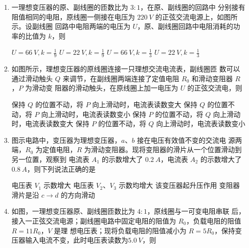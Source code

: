\begin{enumerate}
\item 
{}
一理想变压器的原、副线圈的匝数比为 $ 3:1 $，在原、副线圈的回路中
分别接有阻值相同的电阻，原线圈一侧接在电压为 $ 220 \ V $ 的正弦交流电源上，如图所示。设副线圈
回路中电阻两端的电压为 $ U $，原、副线圈回路中电阻消耗的功率的比值为 $ k $，则  
\begin{figure}[h!]
\centering

\end{figure}

\fourchoices
{$ U=66 \ V ,k= \frac{ 1 }{ 9 } $}
{$ U=22 \ V ,k= \frac{ 1 }{ 9 } $}
{$ U=66 \ V ,k= \frac{ 1 }{ 3 } $}
{$ U=22 \ V ,k= \frac{ 1 }{ 3 } $}


\item 
{}
如图所示，理想变压器的原线圈连接一只理想交流电流表，副线圈匝
数可以通过滑动触头 $ Q $ 来调节，在副线圈两端连接了定值电阻 $ R_{0} $ 和滑动变阻器 $ R $，$ P $ 为滑动变
阻器的滑动触头，在原线圈上加一电压为 $ U $ 的正弦交流电，则  
\begin{figure}[h!]
\centering

\end{figure}

\fourchoices
{保持 $ Q $ 的位置不动，将 $ P $ 向上滑动时，电流表读数变大}
{保持 $ Q $ 的位置不动，将 $ P $ 向上滑动时，电流表读数变小}
{保持 $ P $ 的位置不动，将 $ Q $ 向上滑动时，电流表读数变大}
{保持 $ P $ 的位置不动，将 $ Q $ 向上滑动时，电流表读数变小}


\item 
{}
图示电路中，变压器为理想变压器，$ a $、$ b $ 接在电压有效值不变的交流电
源两端，$ R_{0} $ 为定值电阻，$ R $ 为滑动变阻器。现将变阻器的滑片从一个位置滑动到另一位置，观察到
电流表 $ A_{1} $ 的示数增大了 $ 0.2 \ A $，电流表 $ A_{2} $ 的示数增大了 $ 0.8 \ A $，则下列说法正确的是  
\begin{figure}[h!]
\centering

\end{figure}

\fourchoices
{电压表 $ V_{1} $ 示数增大}
{电压表 $ V_{2} $、$ V_{3} $ 示数均增大}
{该变压器起升压作用}
{变阻器滑片是沿 $ c \rightarrow d $ 的方向滑动}

\item 
{}
如图，一理想变压器原、副线圈匝数比为 $ 4:1 $，原线圈与一可变电阻串联
后，接入一正弦交流电源；副线圈电路中固定电阻的阻值为 $ R_{0} $，负载电阻的阻值 $ R=11 R_{0} $，$ V $ 是理
想电压表；现将负载电阻的阻值减小为 $ R=5 R_{0} $，保持变压器输入电流不变，此时电压表读数为$ 5.0 \ V $，则  
\begin{figure}[h!]
\centering

\end{figure}


\end{enumerate}
